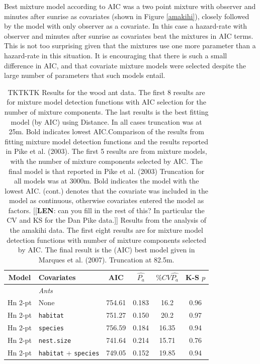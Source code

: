 \documentclass[useAMS,referee, usegraphicx]{biom}
\begin{document}
Best mixture model according to AIC was a two point mixture with observer and minutes after sunrise as covariates (shown in Figure \ref{amakihi}), closely followed by the model with only observer as a covariate. In this case a hazard-rate with observer and minutes after sunrise as covariates beat the mixtures in AIC terms. This is not too surprising given that the mixtures use one more parameter than a hazard-rate in this situation. It is encouraging that there is such a small difference in AIC, and that covariate mixture models were selected despite the large number of parameters that such models entail.


\begin{table}
\caption{TKTKTK Results for the wood ant data. The first 8 results are for mixture model detection functions with AIC selection for the number of mixture components. The last results is the best fitting model (by AIC) using Distance. In all cases truncation was at 25m. Bold indicates lowest AIC.Comparison of the results from fitting mixture model detection functions and the results reported in Pike et al. (2003). The first 5 results are from mixture models, with the number of mixture components selected by AIC. The final model is that reported in Pike et al. (2003) Truncation for all models was at 3000m. Bold indicates the model with the lowest AIC. (cont.) denotes that the covariate was included in the model as continuous, otherwise covariates entered the model as factors. [[\textbf{LEN}: can you fill in the rest of this? In particular the CV and KS for the Dan Pike data.]] Results from the analysis of the amakihi data. The first eight results are for mixture model detection functions with number of mixture components selected by AIC. The final result is the (AIC) best model given in Marques et al. (2007). Truncation at 82.5m.}
\centering
\begin{tabular}{c l c c c c}
\hline \hline
Model & Covariates & AIC & $\hat{P_a}$ & $\% CV \hat{P_a}$ & K-S $p$\\
\hline
 & \textit{Ants} & & & & \\
Hn 2-pt & None & 754.61 & 0.183 & 16.2 & 0.96 \\
Hn 2-pt & \texttt{habitat} & 751.27 & 0.150 & 20.2 & 0.97 \\ 
Hn 2-pt & \texttt{species} & 756.59 & 0.184 & 16.35 & 0.94 \\  
Hn 2-pt & \texttt{nest.size} & 741.64 & 0.214 & 15.71 & 0.76 \\   
Hn 2-pt & \texttt{habitat} + \texttt{species} & 749.05 & 0.152 & 19.85 & 0.94\\ 

\end{tabular}
\end{table}
\end{document}
